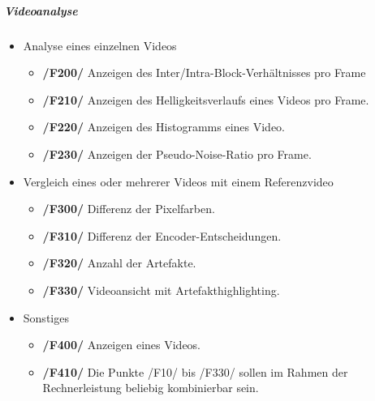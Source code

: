 \subparagraph{Videoanalyse}
\begin{itemize}
	\item Analyse eines einzelnen Videos  
		\begin{itemize}
			\item \textbf{/F200/} Anzeigen des Inter/Intra-Block-Verhältnisses pro Frame
			\item \textbf{/F210/} Anzeigen des Helligkeitsverlaufs eines Videos pro Frame.
			\item \textbf{/F220/} Anzeigen des Histogramms eines Video.
			\item \textbf{/F230/} Anzeigen der Pseudo-Noise-Ratio pro Frame.
		   \end{itemize} 
	\item Vergleich eines oder mehrerer Videos mit einem Referenzvideo
		\begin{itemize}
			\item \textbf{/F300/} Differenz der Pixelfarben.
			\item \textbf{/F310/} Differenz der Encoder-Entscheidungen.
			\item \textbf{/F320/} Anzahl der Artefakte.
			\item \textbf{/F330/} Videoansicht mit Artefakthighlighting.
		\end{itemize}	
	\item Sonstiges
		\begin{itemize}
			\item \textbf{/F400/} Anzeigen eines Videos. 
			\item \textbf{/F410/} Die Punkte /F10/ bis /F330/ sollen im Rahmen der Rechnerleistung beliebig kombinierbar sein.
		\end{itemize}
\end{itemize}

